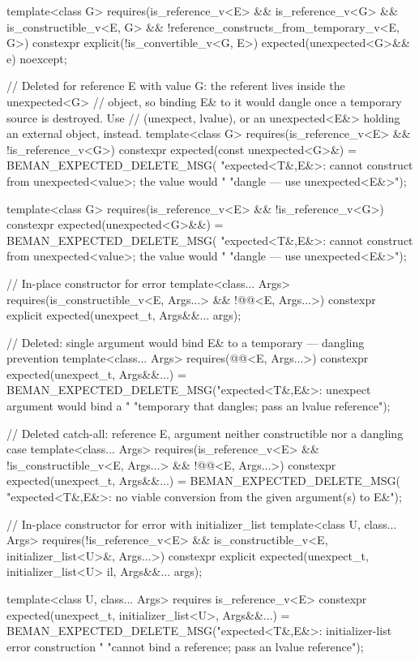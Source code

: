 \begin{codeblock}
{  template<class G>
    requires(is_reference_v<E> && is_reference_v<G> && is_constructible_v<E, G> &&
             !reference_constructs_from_temporary_v<E, G>)
  constexpr explicit(!is_convertible_v<G, E>) expected(unexpected<G>&& e) noexcept;

  // Deleted for reference E with value G: the referent lives inside the unexpected<G>
  // object, so binding E& to it would dangle once a temporary source is destroyed. Use
  // (unexpect, lvalue), or an unexpected<E&> holding an external object, instead.
  template<class G>
    requires(is_reference_v<E> && !is_reference_v<G>)
  constexpr expected(const unexpected<G>&) = BEMAN_EXPECTED_DELETE_MSG(
      "expected<T&,E&>: cannot construct from unexpected<value>; the value would "
      "dangle — use unexpected<E&>");

  template<class G>
    requires(is_reference_v<E> && !is_reference_v<G>)
  constexpr expected(unexpected<G>&&) = BEMAN_EXPECTED_DELETE_MSG(
      "expected<T&,E&>: cannot construct from unexpected<value>; the value would "
      "dangle — use unexpected<E&>");

  // In-place constructor for error
  template<class... Args>
    requires(is_constructible_v<E, Args...> && !@@<E, Args...>)
  constexpr explicit expected(unexpect_t, Args&&... args);

  // Deleted: single argument would bind E& to a temporary — dangling prevention
  template<class... Args>
    requires(@@<E, Args...>)
  constexpr expected(unexpect_t, Args&&...) =
      BEMAN_EXPECTED_DELETE_MSG("expected<T&,E&>: unexpect argument would bind a "
                                "temporary that dangles; pass an lvalue reference");

  // Deleted catch-all: reference E, argument neither constructible nor a dangling case
  template<class... Args>
    requires(is_reference_v<E> && !is_constructible_v<E, Args...> &&
             !@@<E, Args...>)
  constexpr expected(unexpect_t, Args&&...) = BEMAN_EXPECTED_DELETE_MSG(
      "expected<T&,E&>: no viable conversion from the given argument(s) to E&");

  // In-place constructor for error with initializer_list
  template<class U, class... Args>
    requires(!is_reference_v<E> && is_constructible_v<E, initializer_list<U>&, Args...>)
  constexpr explicit expected(unexpect_t, initializer_list<U> il, Args&&... args);

  template<class U, class... Args>
    requires is_reference_v<E>
  constexpr expected(unexpect_t, initializer_list<U>, Args&&...) =
      BEMAN_EXPECTED_DELETE_MSG("expected<T&,E&>: initializer-list error construction "
                                "cannot bind a reference; pass an lvalue reference");

}
\end{codeblock}
